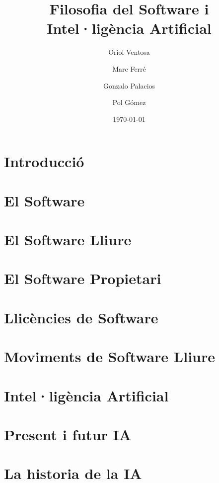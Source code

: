 \documentclass[a4paper,12pt]{report}
\begin{document}


\title{
	{\bf Filosofia del Software i Intel·ligència Artificial}
}
\author{
	Oriol Ventosa \and
	Marc Ferré \and
	Gonzalo Palacios \and
	Pol Gómez
}
\date{\today}
\maketitle

\tableofcontents

\chapter{Introducció}


\chapter{El Software}


\chapter{El Software Lliure}


\chapter{El Software Propietari}


\chapter{Llicències de Software}


\chapter{Moviments de Software Lliure}


\chapter{Intel·ligència Artificial}


\chapter{Present i futur IA}


\chapter{La historia de la IA}




\end{document}
